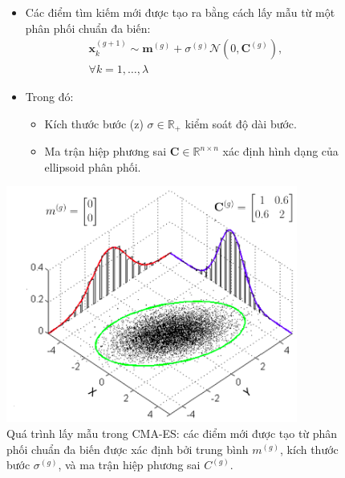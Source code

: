 \documentclass{book}
\begin{document}
\begin{figure}[H]
    \centering
    \begin{minipage}[t]{0.45\textwidth} 
        \vspace{0pt} 
        \begin{itemize}
            \item Các điểm tìm kiếm mới được tạo ra bằng cách lấy mẫu từ một phân phối chuẩn đa biến:
            \begin{equation*}
                \begin{aligned}
                \mathbf{x}_k^{(g+1)}\sim \mathbf{m}^{(g)}+\sigma^{(g)}\mathcal{N}(0, \mathbf{C}^{(g)}), \\ \forall k=1,\dots,\lambda 
                \end{aligned}
            \end{equation*}
            \item Trong đó:
            \begin{itemize}
                \item Kích thước bước (z) $\sigma \in \mathbb{R}_{+}$ kiểm soát độ dài bước.
                \item Ma trận hiệp phương sai $\mathbf{C}\in \mathbb{R}^{n\times n}$ xác định hình dạng của ellipsoid phân phối.
            \end{itemize}
        \end{itemize}
    \end{minipage}\hfill 
    \begin{minipage}[t]{0.45\textwidth} 
        \vspace{0pt} 
        \centering
        \includegraphics[width=\textwidth]{images/sampling_2.png}
    \end{minipage}
    \caption{Quá trình lấy mẫu trong CMA-ES: các điểm mới được tạo từ phân phối chuẩn đa biến được xác định bởi trung bình $m^{(g)}$, kích thước bước $\sigma^{(g)}$, và ma trận hiệp phương sai $C^{(g)}$.}
    \label{fig:cmaes_sampling_process} 
\end{figure}
\end{document}

